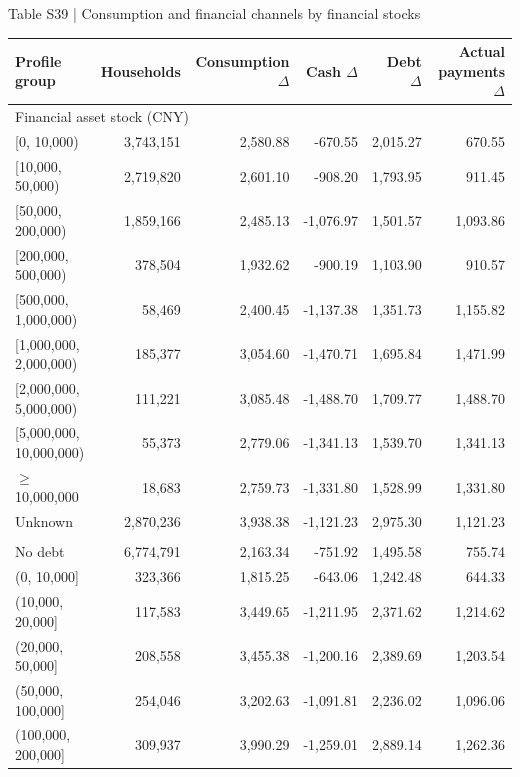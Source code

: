 \documentclass[10pt]{article}
\begin{document}
\clearpage
\begin{center}
\begin{minipage}{\textwidth}
\fontsize{8}{9.8}\selectfont
Table S39 | Consumption and financial channels by financial stocks
\par\vspace{4pt}
\begin{tabularx}{\textwidth}{@{}Xrrrrr@{}}
\toprule
Profile group & Households & Consumption $\Delta$ & Cash $\Delta$ & Debt $\Delta$ & Actual payments $\Delta$ \\
\midrule
\multicolumn{6}{l}{Financial asset stock (CNY)} \\
{[0, 10,000)} & 3,743,151 & 2,580.88 & -670.55 & 2,015.27 & 670.55 \\
{[10,000, 50,000)} & 2,719,820 & 2,601.10 & -908.20 & 1,793.95 & 911.45 \\
{[50,000, 200,000)} & 1,859,166 & 2,485.13 & -1,076.97 & 1,501.57 & 1,093.86 \\
{[200,000, 500,000)} & 378,504 & 1,932.62 & -900.19 & 1,103.90 & 910.57 \\
{[500,000, 1,000,000)} & 58,469 & 2,400.45 & -1,137.38 & 1,351.73 & 1,155.82 \\
{[1,000,000, 2,000,000)} & 185,377 & 3,054.60 & -1,470.71 & 1,695.84 & 1,471.99 \\
{[2,000,000, 5,000,000)} & 111,221 & 3,085.48 & -1,488.70 & 1,709.77 & 1,488.70 \\
{[5,000,000, 10,000,000)} & 55,373 & 2,779.06 & -1,341.13 & 1,539.70 & 1,341.13 \\
{$\geq$10,000,000} & 18,683 & 2,759.73 & -1,331.80 & 1,528.99 & 1,331.80 \\
{Unknown} & 2,870,236 & 3,938.38 & -1,121.23 & 2,975.30 & 1,121.23 \\
\addlinespace[3pt]
\multicolumn{6}{l}{Debt principal stock (CNY)} \\
{No debt} & 6,774,791 & 2,163.34 & -751.92 & 1,495.58 & 755.74 \\
{(0, 10,000]} & 323,366 & 1,815.25 & -643.06 & 1,242.48 & 644.33 \\
{(10,000, 20,000]} & 117,583 & 3,449.65 & -1,211.95 & 2,371.62 & 1,214.62 \\
{(20,000, 50,000]} & 208,558 & 3,455.38 & -1,200.16 & 2,389.69 & 1,203.54 \\
{(50,000, 100,000]} & 254,046 & 3,202.63 & -1,091.81 & 2,236.02 & 1,096.06 \\
{(100,000, 200,000]} & 309,937 & 3,990.29 & -1,259.01 & 2,889.14 & 1,262.36 \\

\end{tabularx}
\end{minipage}
\end{center}
\end{document}
